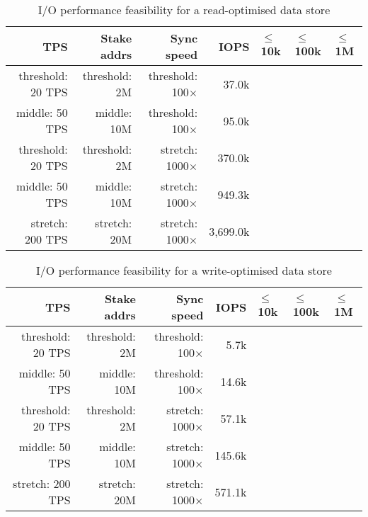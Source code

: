 \documentclass[11pt,a4paper]{article}
\begin{document}
\begin{table}
\centering
\newcommand{\feasible}{\cellcolor{green!25}\ding{52}}
\newcommand{\plausible}{\cellcolor{orange!25}\ding{52}}
\newcommand{\infeasible}{\cellcolor{red!25}\ding{54}}
\begin{tabular}[]{rrrrlll}
  TPS & Stake addrs & Sync speed & IOPS & $\leq$10k & $\leq$100k & $\leq$1M \\
  \toprule
   threshold: 20 TPS & threshold: 2M & threshold: 100$\times$ &  37.0k & \infeasible & \feasible   & \feasible \\
   middle:    50 TPS &   middle: 10M & threshold: 100$\times$ &  95.0k & \infeasible & \plausible  & \feasible \\
   threshold: 20 TPS & threshold: 2M & stretch:  1000$\times$ & 370.0k & \infeasible & \infeasible & \feasible \\
   middle:    50 TPS &   middle: 10M & stretch:  1000$\times$ & 949.3k & \infeasible & \infeasible & \plausible \\
  stretch:   200 TPS &  stretch: 20M & stretch:  1000$\times$ & 3,699.0k & \infeasible & \infeasible & \infeasible \\
  \bottomrule
\end{tabular}
\caption{I/O performance feasibility for a read-optimised data store}
\label{table:io-perf-feasibility-read}
\end{table}
\begin{table}
\centering
\newcommand{\feasible}{\cellcolor{green!25}\ding{52}}
\newcommand{\plausible}{\cellcolor{orange!25}\ding{52}}
\newcommand{\infeasible}{\cellcolor{red!25}\ding{54}}
\begin{tabular}[]{rrrrlll}
  TPS & Stake addrs & Sync speed & IOPS & $\leq$10k & $\leq$100k & $\leq$1M \\
  \toprule
   threshold: 20 TPS & threshold: 2M & threshold: 100$\times$ &   5.7k & \feasible   & \feasible   & \feasible \\
   middle:    50 TPS &   middle: 10M & threshold: 100$\times$ &  14.6k & \infeasible  & \feasible   & \feasible \\
   threshold: 20 TPS & threshold: 2M & stretch:  1000$\times$ &  57.1k & \infeasible & \feasible   & \feasible \\
   middle:    50 TPS &   middle: 10M & stretch:  1000$\times$ & 145.6k & \infeasible & \infeasible & \feasible \\
  stretch:   200 TPS &  stretch: 20M & stretch:  1000$\times$ & 571.1k & \infeasible & \infeasible & \feasible \\
  \bottomrule
\end{tabular}
\caption{I/O performance feasibility for a write-optimised data store}
\label{table:io-perf-feasibility-write}
\end{table}
\end{document}
